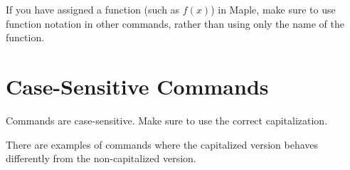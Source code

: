 If you have assigned a function (such as $f(x)$) in Maple, make sure to use function notation in other commands, rather than using only the name of the function.

\begin{maplegroup}
\begin{mapleinput}
\end{mapleinput}
\mapleresult
\begin{maplelatex}
\end{maplelatex}
\mapleresult
\begin{maplelatex}
\end{maplelatex}
\end{maplegroup}

\section*{Case-Sensitive Commands}

Commands are case-sensitive. Make sure to use the correct capitalization.

\begin{maplegroup}
\begin{mapleinput}
\end{mapleinput}
\mapleresult
\begin{maplelatex}
\end{maplelatex}
\end{maplegroup}

There are examples of commands where the capitalized version behaves differently from the non-capitalized version.

